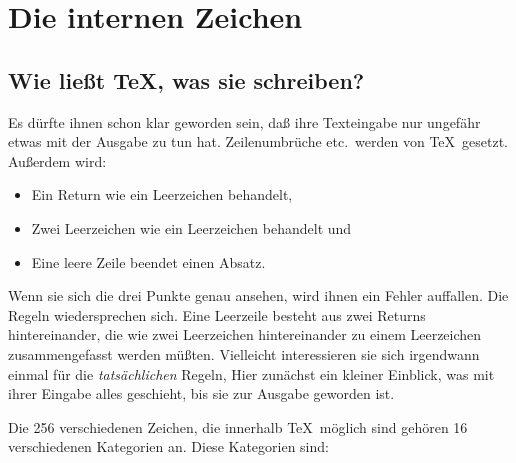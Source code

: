 \chapter{Die internen Zeichen}
\section{Wie lie\ss{}t \TeX, was sie schreiben?}
Es d\"urfte ihnen schon klar geworden sein, da\ss{} ihre Texteingabe nur
ungef\"ahr etwas mit der 
Ausgabe zu tun hat. Zeilenumbr\"uche etc.\ werden
von \TeX\ gesetzt. Au\ss{}erdem wird:
\begin{itemize}
\item Ein Return wie ein Leerzeichen behandelt,
\item Zwei Leerzeichen wie ein Leerzeichen behandelt und
\item Eine leere Zeile beendet einen Absatz.
\end{itemize}
Wenn sie sich die drei 
Punkte genau ansehen, wird ihnen ein Fehler
auffallen. Die Regeln wieder\-spre\-chen sich. Eine 
Leerzeile besteht aus
zwei Returns hintereinander, die wie zwei Leerzeichen hintereinander
zu einem Leerzeichen zusammengefasst werden m\"u\ss{}ten. Vielleicht
interessieren sie sich irgendwann einmal f\"ur die {\em tats\"achlichen}
Regeln, Hier zun\"achst ein kleiner Einblick, was mit ihrer Eingabe
alles geschieht, bis sie zur Ausgabe geworden ist.

Die 256 verschiedenen Zeichen, die innerhalb \TeX\ m\"oglich sind
geh\"oren 16 verschiedenen 
Ka\-te\-gori\-en an. Diese Kategorien sind:\medskip

